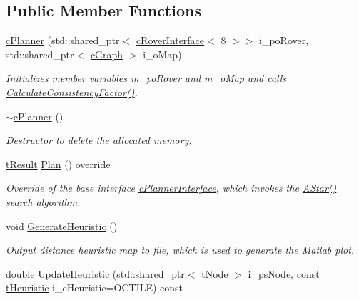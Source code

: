 \subsection*{Public Member Functions}
\begin{DoxyCompactItemize}
\item 
\mbox{\hyperlink{classplanner_1_1c_planner_a381d86c14532f65cf21cb80b4c64ce0e}{c\+Planner}} (std\+::shared\+\_\+ptr$<$ \mbox{\hyperlink{classplanner_1_1c_rover_interface}{c\+Rover\+Interface}}$<$ 8 $>$$>$ i\+\_\+po\+Rover, std\+::shared\+\_\+ptr$<$ \mbox{\hyperlink{classplanner_1_1c_graph}{c\+Graph}} $>$ i\+\_\+o\+Map)
\begin{DoxyCompactList}\small\item\em Initializes member variables m\+\_\+po\+Rover and m\+\_\+o\+Map and calls \mbox{\hyperlink{classplanner_1_1c_planner_a2e5a745f83f903662eff914d8beddb5e}{Calculate\+Consistency\+Factor()}}. \end{DoxyCompactList}\item 
\mbox{\label{classplanner_1_1c_planner_aa9ae1109d3c4b7ac19aef2616547654e}} 
\mbox{\hyperlink{classplanner_1_1c_planner_aa9ae1109d3c4b7ac19aef2616547654e}{$\sim$c\+Planner}} ()
\begin{DoxyCompactList}\small\item\em Destructor to delete the allocated memory. \end{DoxyCompactList}\item 
\mbox{\hyperlink{structt_result}{t\+Result}} \mbox{\hyperlink{classplanner_1_1c_planner_a21230c015260b9fc34ad2f239592470e}{Plan}} () override
\begin{DoxyCompactList}\small\item\em Override of the base interface \mbox{\hyperlink{classplanner_1_1c_planner_interface}{c\+Planner\+Interface}}, which invokes the \mbox{\hyperlink{classplanner_1_1c_planner_a341e70531266f023ac9461d18979d1ef}{A\+Star()}} search algorithm. \end{DoxyCompactList}\item 
void \mbox{\hyperlink{classplanner_1_1c_planner_a1a4650050656545744796296a653d388}{Generate\+Heuristic}} ()
\begin{DoxyCompactList}\small\item\em Output distance heuristic map to file, which is used to generate the Matlab plot. \end{DoxyCompactList}\item 
double \mbox{\hyperlink{classplanner_1_1c_planner_ab7cc7c2666de2e49f745901080aac147}{Update\+Heuristic}} (std\+::shared\+\_\+ptr$<$ \mbox{\hyperlink{structplanner_1_1t_node}{t\+Node}} $>$ i\+\_\+ps\+Node, const \mbox{\hyperlink{classplanner_1_1c_planner_a7f6dc4cbb69dd1ede14a67b0a7bd425b}{t\+Heuristic}} i\+\_\+e\+Heuristic=O\+C\+T\+I\+LE) const
$$
\end{DoxyCompactItemize}
